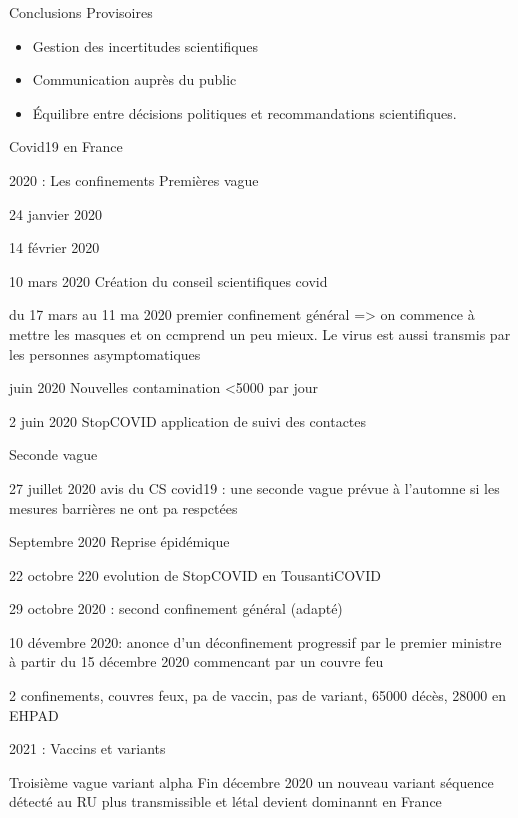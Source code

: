 \documentclass[
  ignorenonframetext,
]{beamer}
\providecommand{\tightlist}{%
  \setlength{\itemsep}{0pt}\setlength{\parskip}{0pt}}\usepackage{longtable,booktabs,array}
\begin{document}
\begin{frame}{Conclusions Provisoires}
\begin{enumerate}
\begin{itemize}
    \begin{itemize}
    \tightlist
    \item
      Gestion des incertitudes scientifiques\\
    \item
      Communication auprès du public\\
    \item
      Équilibre entre décisions politiques et recommandations
      scientifiques.
    \end{itemize}
  \end{itemize}
\end{enumerate}
\end{frame}

\begin{frame}{Covid19 en France}
\protect\hypertarget{covid19-en-france}{}
\begin{block}{2020 : Les confinements}
\protect\hypertarget{les-confinements}{}
Premières vague

24 janvier 2020

14 février 2020

10 mars 2020 Création du conseil scientifiques covid

du 17 mars au 11 ma 2020 premier confinement général =\textgreater{} on
commence à mettre les masques et on ccmprend un peu mieux. Le virus est
aussi transmis par les personnes asymptomatiques

juin 2020 Nouvelles contamination \textless5000 par jour

2 juin 2020 StopCOVID application de suivi des contactes

Seconde vague

27 juillet 2020 avis du CS covid19 : une seconde vague prévue à
l'automne si les mesures barrières ne ont pa respctées

Septembre 2020 Reprise épidémique

22 octobre 220 evolution de StopCOVID en TousantiCOVID

29 octobre 2020 : second confinement général (adapté)

10 dévembre 2020: anonce d'un déconfinement progressif par le premier
ministre à partir du 15 décembre 2020 commencant par un couvre feu

2 confinements, couvres feux, pa de vaccin, pas de variant, 65000 décès,
28000 en EHPAD
\end{block}

\begin{block}{2021 : Vaccins et variants}
\protect\hypertarget{vaccins-et-variants}{}
\begin{block}{Troisième vague variant alpha}
\protect\hypertarget{troisiuxe8me-vague-variant-alpha}{}
Fin décembre 2020 un nouveau variant séquence détecté au RU plus
transmissible et létal devient dominannt en France


\end{block}
\end{block}
\end{frame}
\end{document}
